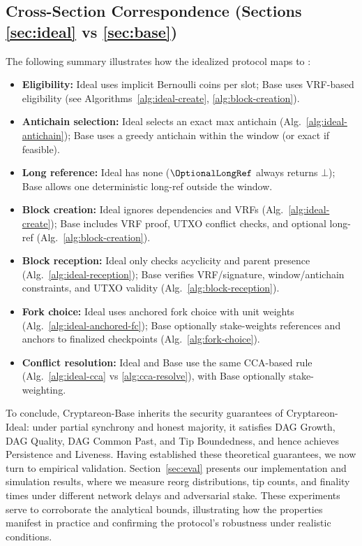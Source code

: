 \subsection{Cross-Section Correspondence (Sections \ref{sec:ideal} vs \ref{sec:base})}
The following summary illustrates how the idealized protocol maps to \ProjBase:
\begin{itemize}
  \item \textbf{Eligibility:} Ideal uses implicit Bernoulli coins per slot; Base uses VRF-based eligibility (see Algorithms~\ref{alg:ideal-create}, \ref{alg:block-creation}).
  \item \textbf{Antichain selection:} Ideal selects an exact max antichain (Alg.~\ref{alg:ideal-antichain}); Base uses a greedy antichain within the window (or exact if feasible).
  \item \textbf{Long reference:} Ideal has none ($\OptionalLongRef$ always returns $\bot$); Base allows one deterministic long-ref outside the window.
  \item \textbf{Block creation:} Ideal ignores dependencies and VRFs (Alg.~\ref{alg:ideal-create}); Base includes VRF proof, UTXO conflict checks, and optional long-ref (Alg.~\ref{alg:block-creation}).
  \item \textbf{Block reception:} Ideal only checks acyclicity and parent presence (Alg.~\ref{alg:ideal-reception}); Base verifies VRF/signature, window/antichain constraints, and UTXO validity (Alg.~\ref{alg:block-reception}).
  \item \textbf{Fork choice:} Ideal uses anchored fork choice with unit weights (Alg.~\ref{alg:ideal-anchored-fc}); Base optionally stake-weights references and anchors to finalized checkpoints (Alg.~\ref{alg:fork-choice}).
  \item \textbf{Conflict resolution:} Ideal and Base use the same CCA-based rule (Alg.~\ref{alg:ideal-cca} vs \ref{alg:cca-resolve}), with Base optionally stake-weighting.
\end{itemize}

To conclude, Cryptareon-Base inherits the security guarantees of Cryptareon-Ideal: under partial synchrony and honest majority, it satisfies DAG Growth, DAG Quality, DAG Common Past, and Tip Boundedness, and hence achieves Persistence and Liveness. Having established these theoretical guarantees, we now turn to empirical validation. Section~\ref{sec:eval} presents our implementation and simulation results, where we measure reorg distributions, tip counts, and finality times under different network delays and adversarial stake. These experiments serve to corroborate the analytical bounds, illustrating how the properties manifest in practice and confirming the protocol’s robustness under realistic conditions.





\ignore{%



}%
